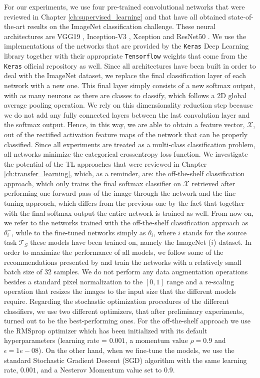 For our experiments, we use four pre-trained convolutional networks that were reviewed in Chapter \ref{ch:supervised_learning} and that have all obtained state-of-the-art results on the ImageNet classification challenge. These neural architectures are VGG19 \cite{simonyan2014very}, Inception-V3 \cite{szegedy2016rethinking}, Xception \cite{chollet2016xception} and ResNet50 \cite{xie2017aggregated}. We use the implementations of the networks that are provided by the \texttt{Keras} Deep Learning library \cite{chollet2015keras} together with their appropriate \texttt{Tensorflow} weights \cite{abadi2016tensorflow} that come from the \texttt{Keras} official repository as well. Since all architectures have been built in order to deal with the ImageNet dataset, we replace the final classification layer of each network with a new one. This final layer simply consists of a new softmax output, with as many neurons as there are classes to classify, which follows a 2D global average pooling operation. We rely on this dimensionality reduction step because we do not add any fully connected layers between the last convolution layer and the softmax output. Hence, in this way, we are able to obtain a feature vector, $\mathscr{X}$, out of the rectified activation feature maps of the network that can be properly classified. Since all experiments are treated as a multi-class classification problem, all networks minimize the categorical crossentropy loss function. We investigate the potential of the TL approaches that were reviewed in Chapter \ref{ch:transfer_learning}, which, as a reminder, are: the off-the-shelf classification approach, which only trains the final softmax classifier on $\mathscr{X}$ retrieved after performing one forward pass of the image through the network and the fine-tuning approach, which differs from the previous one by the fact that together with the final softmax output the entire network is trained as well. 
From now on, we refer to the networks trained with the off-the-shelf classification approach as $\theta^{-}_{i}$, while to the fine-tuned networks simply as $\theta_{i}$, where $i$ stands for the source task $\mathcal{T}_S$ these models have been trained on, namely the ImageNet ($i$) dataset. In order to maximize the performance of all models, we follow some of the recommendations presented by \citet{masters2018revisiting} and train the networks with a relatively small batch size of $32$ samples. We do not perform any data augmentation operations besides a standard pixel normalization to the $[0, 1]$ range and a re-scaling operation that resizes the images to the input size that the different models require. Regarding the stochastic optimization procedures of the different classifiers, we use two different optimizers, that after preliminary experiments, turned out to be the best-performing ones. For the off-the-shelf approach we use the RMSprop optimizer \cite{tieleman2012lecture} which has been initialized with its default hyperparameters (learning rate = $0.001$, a momentum value $\rho = 0.9$ and $\epsilon =1e-08$). On the other hand, when we fine-tune the models, we use the standard Stochastic Gradient Descent (SGD) algorithm with the same learning rate, $0.001$, and a Nesterov Momentum value \cite{nesterov1983method} set to $0.9$.
